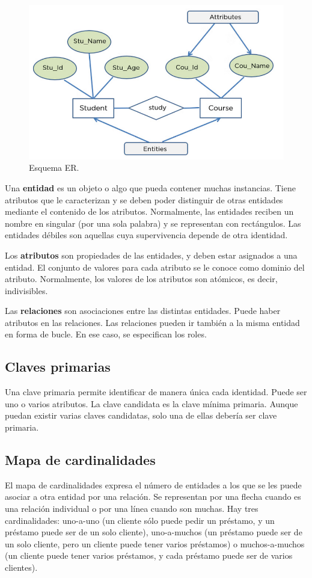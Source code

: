 \begin{figure}[htbp]
\centering
\includegraphics[width=0.5\linewidth]{figs/esquema-er.png}
\caption{Esquema ER.}
\end{figure}

Una \textbf{entidad} es un objeto o algo que pueda contener muchas instancias. Tiene atributos que le caracterizan y se deben poder distinguir de otras entidades mediante el contenido de los atributos. Normalmente, las entidades reciben un nombre en singular (por una sola palabra) y se representan con rectángulos. Las entidades débiles son aquellas cuya supervivencia depende de otra identidad.

Los \textbf{atributos} son propiedades de las entidades, y deben estar asignados a una entidad. El conjunto de valores para cada atributo se le conoce como dominio del atributo. Normalmente, los valores de los atributos son atómicos, es decir, indivisibles.

Las \textbf{relaciones} son asociaciones entre las distintas entidades. Puede haber atributos en las relaciones. Las relaciones pueden ir también a la misma entidad en forma de bucle. En ese caso, se especifican los roles.

\subsection{Claves primarias}
Una clave primaria permite identificar de manera única cada identidad. Puede ser uno o varios atributos. La clave candidata es la clave mínima primaria. Aunque puedan existir varias claves candidatas, solo una de ellas debería ser clave primaria. 

\subsection{Mapa de cardinalidades}
El mapa de cardinalidades expresa el número de entidades a los que se les puede asociar a otra entidad por una relación. Se representan por una flecha cuando es una relación individual o por una línea cuando son muchas. Hay tres cardinalidades: uno-a-uno (un cliente sólo puede pedir un préstamo, y un préstamo puede ser de un solo cliente), uno-a-muchos (un préstamo puede ser de un solo cliente, pero un cliente puede tener varios préstamos) o muchos-a-muchos (un cliente puede tener varios préstamos, y cada préstamo puede ser de varios clientes). 

